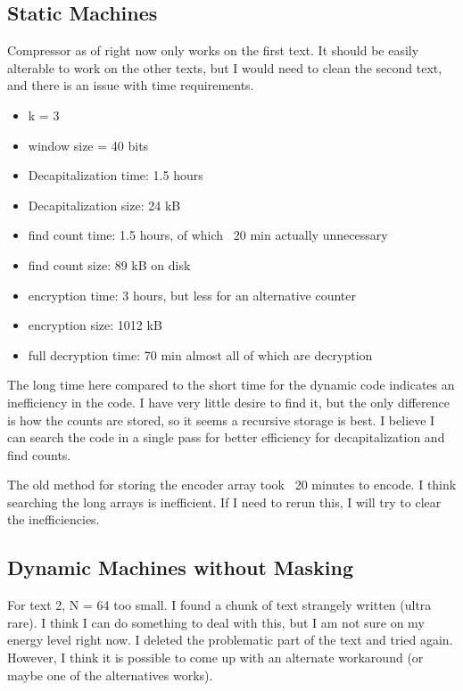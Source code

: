 \documentclass{article}
\begin{document}
\subsection{Static Machines}

Compressor as of right now only works on the first text. It should be easily alterable to work on the other texts, but I would need to clean the second text, and there is an issue with time requirements.

\begin{itemize}
\item k = 3
\item window size = 40 bits
\item Decapitalization time: 1.5 hours
\item Decapitalization size: 24 kB
\item find count time: 1.5 hours, of which ~20 min actually unnecessary
\item find count size: 89 kB on disk
\item encryption time: 3 hours, but less for an alternative counter
\item encryption size: 1012 kB
\item full decryption time: 70 min almost all of which are decryption
\end{itemize}

The long time here compared to the short time for the dynamic code indicates an inefficiency in the code. I have very little desire to find it, but the only difference is how the counts are stored, so it seems a recursive storage is best. I believe I can search the code in a single pass for better efficiency for decapitalization and find counts.

The old method for storing the encoder array took ~20 minutes to encode. I think searching the long arrays is inefficient. If I need to rerun this, I will try to clear the inefficiencies.


\subsection{Dynamic Machines without Masking}

For text 2, N = 64 too small. I found a chunk of text strangely written (ultra rare). I think I can do something to deal with this, but I am not sure on my energy level right now. I deleted the problematic part of the text and tried again. However, I think it is possible to come up with an alternate workaround (or maybe one of the alternatives works). 
\end{document}
